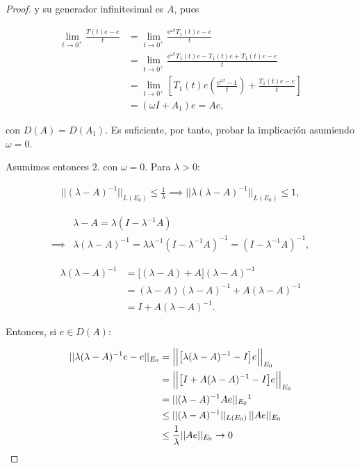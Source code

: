 \begin{proof}
    y su generador infinitesimal es $A$, pues

    \begin{align*}
        \lim_{t \rightarrow 0^+} \frac{T(t)e - e}{t} &= \lim_{t \rightarrow 0^+} \frac{\mathrm{e}^{\omega t}T_1(t)e - e}{t}\\
        &= \lim_{t \rightarrow 0^+}\frac{\mathrm{e}^{\omega t}T_1(t)e - T_1(t)e + T_1(t)e - e}{t}\\
        &= \lim_{t \rightarrow 0^+} \left [ T_1(t)e \left (\frac{\mathrm{e}^{\omega t} - 1}{t} \right) + \frac{T_1(t)e - e}{t} \right ]\\
        &= (\omega I + A_1)e = Ae,
    \end{align*}

    con $D(A) = D(A_1)$. Es suficiente, por tanto, probar la implicación asumiendo $\omega = 0$.

    Asumimos entonces $2.$ con $\omega = 0$. Para $\lambda > 0$:

    \begin{align*}
        ||(\lambda -A)^{-1}||_{L(E_0)} \leq \frac{1}{\lambda} \implies ||\lambda(\lambda -A)^{-1}||_{L(E_0)} \leq 1,
    \end{align*}

    \begin{align*}
        &\lambda - A = \lambda(I - \lambda^{-1}A)\\
        \implies& \lambda(\lambda - A)^{-1} = \lambda \lambda^{-1}(I - \lambda^{-1}A)^{-1} = (I - \lambda^{-1}A)^{-1}, 
    \end{align*}

    \begin{align*}
        \lambda(\lambda - A)^{-1} &= \big[(\lambda - A) + A \big](\lambda - A)^{-1}\\
        &= (\lambda - A)(\lambda - A)^{-1} + A(\lambda - A)^{-1}\\
        &= I + A(\lambda - A)^{-1}.
    \end{align*}

    Entonces, si $e \in D(A)$:

    \begin{align*}
        ||\lambda(\lambda - A)^{-1}e - e||_{E_0} &= \Big|\Big|\big[\lambda(\lambda - A)^{-1} - I\big]e\Big|\Big|_{E_0}\\
        &= \Big|\Big|\big[I + A(\lambda - A)^{-1} - I\big]e\Big|\Big|_{E_0}\\
        &= ||(\lambda -A)^{-1}Ae||_{E_0}\footnotemark \\
        &\leq ||(\lambda -A)^{-1}||_{L(E_0)} \, ||Ae||_{E_0}\\
        &\leq \frac{1}{\lambda} ||Ae||_{E_0} \rightarrow 0
    \end{align*}


\end{proof}
